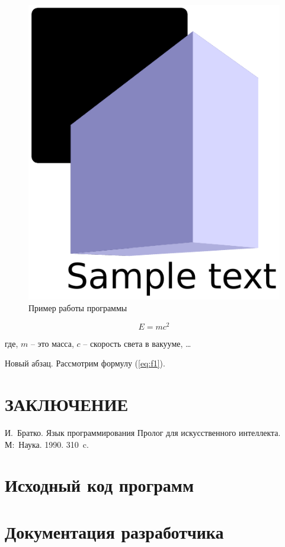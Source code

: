 \documentclass[14pt,final]{report}
\begin{document}
\begin{figure}[hbtp]
  \centering
  \includegraphics[width=0.3\linewidth]{fig1.pdf}
  \caption{Пример работы программы}
  \label{fig:prog-ex}
\end{figure}


\begin{equation}
  \label{eq:f1}
  E=mc^2
\end{equation}

\noindent{}где, $m$ -- это масса, $c$ -- скорость света в вакууме, \ldots

Новый абзац. Рассмотрим формулу (\ref{eq:f1}).


\chapter*{ЗАКЛЮЧЕНИЕ}



\begin{thebibliography}{99}
 И.~Братко. Язык программирования Пролог для искусственного интеллекта. М\;:~Наука. 1990. 310~c.
\end{thebibliography}

\appendix

\chapter{Исходный код программ}
\chapter{Документация разработчика}
\end{document}
